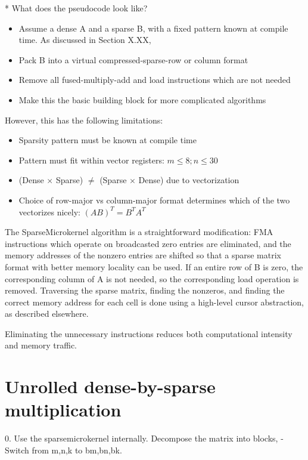 * What does the pseudocode look like?

\begin{itemize}
    \item Assume a dense A and a sparse B, with a fixed pattern known at compile time. As discussed in Section X.XX, 
    \item Pack B into a virtual compressed-sparse-row or column format
    \item Remove all fused-multiply-add and load instructions which are not needed
    \item Make this the basic building block for more complicated algorithms 
\end{itemize}




However, this has the following limitations:
\begin{itemize}
    \item Sparsity pattern must be known at compile time
    \item Pattern must fit within vector registers: $m \leq 8;  n \leq 30$
    \item (Dense $\times$ Sparse) $\neq$ (Sparse $\times$ Dense) due to vectorization
    \item Choice of row-major vs column-major format determines which of the two vectorizes nicely: $(AB)^T = B^T A^T$
\end{itemize}




The SparseMicrokernel algorithm is a straightforward modification: FMA instructions which operate on 
broadcasted zero entries are eliminated, and the memory addresses of the nonzero entries are 
shifted so that a sparse matrix format with better memory locality can be used. If an entire 
row of B is zero, the corresponding column of A is not needed, so the corresponding load 
operation is removed. Traversing the sparse matrix, finding the nonzeros, and finding the correct
memory address for each cell is done using a high-level cursor abstraction, as described elsewhere.   

Eliminating the unnecessary instructions reduces both computational intensity and memory traffic.


\section{Unrolled dense-by-sparse multiplication}



0. Use the sparsemicrokernel internally. Decompose the matrix into blocks, 
  - Switch from m,n,k to bm,bn,bk.

